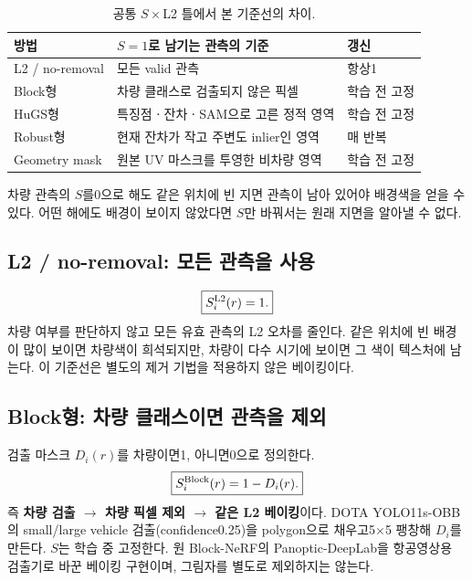 \documentclass[11pt,a4paper]{article}
\begin{document}
\begin{table}[htbp]\centering\small
\caption{공통 $S\times$L2 틀에서 본 기준선의 차이.}\label{tab:s-overview}
\renewcommand{\arraystretch}{1.2}
\begin{tabular}{lp{80mm}l}\toprule
방법 & $S=1$로 남기는 관측의 기준 & 갱신\\\midrule
L2 / no-removal & 모든 valid 관측 & 항상1\\
Block형 & 차량 클래스로 검출되지 않은 픽셀 & 학습 전 고정\\
HuGS형 & 특징점ㆍ잔차ㆍSAM으로 고른 정적 영역 & 학습 전 고정\\
Robust형 & 현재 잔차가 작고 주변도 inlier인 영역 & 매 반복\\
Geometry mask & 원본 UV 마스크를 투영한 비차량 영역 & 학습 전 고정\\\bottomrule
\end{tabular}\end{table}

차량 관측의 $S$를0으로 해도 같은 위치에 빈 지면 관측이 남아 있어야 배경색을 얻을 수 있다. 어떤 해에도 배경이 보이지 않았다면 $S$만 바꿔서는 원래 지면을 알아낼 수 없다.

\subsection{L2 / no-removal: 모든 관측을 사용}
\begin{equation}
 \boxed{S_i^{\rm L2}(r)=1.}
\end{equation}
차량 여부를 판단하지 않고 모든 유효 관측의 L2 오차를 줄인다. 같은 위치에 빈 배경이 많이 보이면 차량색이 희석되지만, 차량이 다수 시기에 보이면 그 색이 텍스처에 남는다. 이 기준선은 별도의 제거 기법을 적용하지 않은 베이킹이다.

\subsection{Block형: 차량 클래스이면 관측을 제외}
검출 마스크 $D_i(r)$를 차량이면1, 아니면0으로 정의한다.
\begin{equation}
 \boxed{S_i^{\rm Block}(r)=1-D_i(r).}
\end{equation}
즉 \textbf{차량 검출 $\rightarrow$ 차량 픽셀 제외 $\rightarrow$ 같은 L2 베이킹}이다. DOTA YOLO11s-OBB의 small/large vehicle 검출(confidence0.25)을 polygon으로 채우고5$\times$5 팽창해 $D_i$를 만든다. $S$는 학습 중 고정한다. 원 Block-NeRF의 Panoptic-DeepLab을 항공영상용 검출기로 바꾼 베이킹 구현이며, 그림자를 별도로 제외하지는 않는다.
\end{document}
